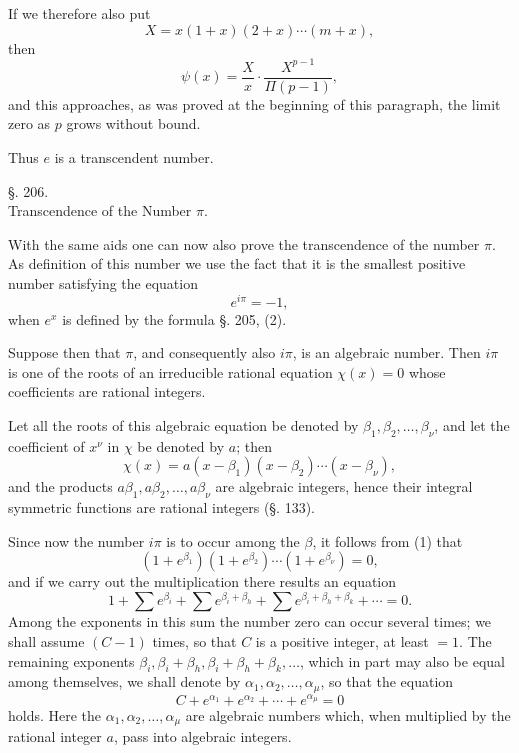 \documentclass[11pt]{article}
\begin{document}
If we therefore also put
\[
X=x(1+x)(2+x)\cdots(m+x),
\]
then
\begin{equation}\tag{18}
\psi(x)=\frac{X}{x}\cdot\frac{X^{p-1}}{\Pi(p-1)},
\end{equation}
and this approaches, as was proved at the beginning of this paragraph, the limit zero as $p$ grows without bound.

Thus $e$ is a transcendent number.

\begin{center}
{\large §. 206.}\\[0.4em]
{\large Transcendence of the Number $\pi$.}
\end{center}

With the same aids one can now also prove the transcendence of the number $\pi$. As definition of this number we use the fact that it is the smallest positive number satisfying the equation
\begin{equation}\tag{1}
e^{i\pi}=-1,
\end{equation}
when $e^x$ is defined by the formula §. 205, (2).

Suppose then that $\pi$, and consequently also $i\pi$, is an algebraic number. Then $i\pi$ is one of the roots of an irreducible rational equation $\chi(x)=0$ whose coefficients are rational integers.

Let all the roots of this algebraic equation be denoted by $\beta_1,\beta_2,\ldots,\beta_\nu$, and let the coefficient of $x^\nu$ in $\chi$ be denoted by $a$; then
\begin{equation}\tag{2}
\chi(x)=a(x-\beta_1)(x-\beta_2)\cdots(x-\beta_\nu),
\end{equation}
and the products $a\beta_1,a\beta_2,\ldots,a\beta_\nu$ are algebraic integers, hence their integral symmetric functions are rational integers (§. 133).

Since now the number $i\pi$ is to occur among the $\beta$, it follows from (1) that
\[
(1+e^{\beta_1})(1+e^{\beta_2})\cdots(1+e^{\beta_\nu})=0,
\]
and if we carry out the multiplication there results an equation
\[
1+\sum e^{\beta_i}+\sum e^{\beta_i+\beta_h}
+\sum e^{\beta_i+\beta_h+\beta_k}+\cdots=0.
\]
Among the exponents in this sum the number zero can occur several times; we shall assume $(C-1)$ times, so that $C$ is a positive integer, at least $=1$. The remaining exponents $\beta_i,\beta_i+\beta_h,\beta_i+\beta_h+\beta_k,\ldots$, which in part may also be equal among themselves, we shall denote by $\alpha_1,\alpha_2,\ldots,\alpha_\mu$, so that the equation
\begin{equation}\tag{3}
C+e^{\alpha_1}+e^{\alpha_2}+\cdots+e^{\alpha_\mu}=0
\end{equation}
holds. Here the $\alpha_1,\alpha_2,\ldots,\alpha_\mu$ are algebraic numbers which, when multiplied by the rational integer $a$, pass into algebraic integers.
\end{document}
